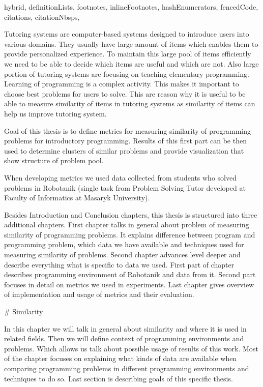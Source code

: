 \documentclass[
  digital, %
  table,   %
  nolof,     %
  nolot,     %
  nocover
]{fithesis3}
\begin{document}
\begin{markdown*}{%
  hybrid,
  definitionLists,
  footnotes,
  inlineFootnotes,
  hashEnumerators,
  fencedCode,
  citations,
  citationNbsps,
}

%
%

Tutoring systems are computer-based systems designed to introduce users into various domains.
They usually have large amount of items which enables them to provide personalized experience. To maintain this large pool of items efficiently we need to be able to decide which items are useful and which are not. Also large portion of tutoring systems are focusing on teaching elementary programming. Learning of programming is a complex activity. This makes it important to choose best problems for users to solve.
This are reason why it is useful to be able to measure similarity of items in tutoring systems as similarity of items can help us improve tutoring system.

Goal of this thesis is to define metrics for measuring similarity of programming problems for introductory programming. Results of this first part can be then used to determine clusters of similar problems and provide visualization that show structure of problem pool.

When developing metrics we used data collected from students who solved problems in Robotanik (single task from Problem Solving Tutor developed at Faculty of Informatics at Masaryk University).

Besides Introduction and Conclusion chapters, this thesis is structured into three additional chapters. First chapter talks in general about problem of measuring similarity of programming problems. It explains difference between program and programming problem, which data we have available and techniques used for measuring similarity of problems. Second chapter advances level deeper and describe everything what is specific to data we used. First part of chapter describes programming environment of Robotanik and data from it. Second part focuses in detail on metrics we used in experiments. Last chapter gives overview of implementation and usage of metrics and their evaluation.


%
%

# Similarity

In this chapter we will talk in general about similarity and where it is used in related fields. Then we will define context of programming environments and problems. Which allows us talk about possible usage of results of this work. Most of the chapter focuses on explaining what kinds of data are available when comparing programming problems in different programming environments and techniques to do so. Last section is describing goals of this specific thesis.


\end{markdown*}
\end{document}
